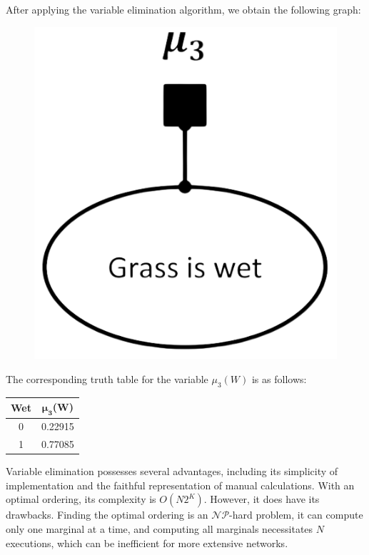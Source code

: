 \begin{example}
\begin{figure}[H]
    \end{figure} 
    After applying the variable elimination algorithm, we obtain the following graph:
    \begin{figure}[H]
        \centering
        \includegraphics[width=0.15\linewidth]{images/fg1.png}
    \end{figure} 
    The corresponding truth table for the variable $\mu_3(W)$ is as follows:
    \begin{table}[H]
        \centering
        \begin{tabular}{cc}
        \hline
        \textbf{Wet} & \textbf{$\boldsymbol{\mu_3}$(W)} \\ \hline
        0      & 0.22915  \\
        1      & 0.77085  \\ \hline
        \end{tabular}
    \end{table}
\end{example}
Variable elimination possesses several advantages, including its simplicity of implementation and the faithful representation of manual calculations. 
With an optimal ordering, its complexity is $O(N2^K)$.
However, it does have its drawbacks. 
Finding the optimal ordering is an $\mathcal{NP}$-hard problem, it can compute only one marginal at a time, and computing all marginals necessitates $N$ executions, which can be inefficient for more extensive networks.